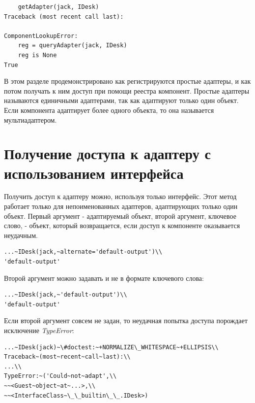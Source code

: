 \documentclass[a4paper,openany,twoside,draft]{book}
\providecommand*{\DUroletitlereference}[1]{\textsl{#1}}
\begin{document}
\begin{verbatim}
    getAdapter(jack, IDesk)
Traceback (most recent call last):

ComponentLookupError:
    reg = queryAdapter(jack, IDesk)
    reg is None
True
\end{verbatim}

В этом разделе продемонстрировано как регистрируются простые адаптеры,
и как потом получать к ним доступ при помощи реестра компонент.
Простые адаптеры называются единичными адаптерами, так как адаптируют
только один объект.  Если компонента адаптирует более одного объекта,
то она называется мультиадаптером.


\section{Получение доступа к адаптеру с использованием интерфейса%
  \label{id37}%
}

Получить доступ к адаптеру можно, используя только интерфейс.  Этот
метод работает только для непоименованных адаптеров, адаптирующих
только один объект.  Первый аргумент - адаптируемый объект, второй
аргумент, ключевое слово, - объект, который возвращается, если доступ
к компоненте оказывается неудачным.

\begin{verbatim}
...~IDesk(jack,~alternate='default-output')\\
'default-output'
\end{verbatim}

Второй аргумент можно задавать и не в формате ключевого слова:

\begin{verbatim}
...~IDesk(jack,~'default-output')\\
'default-output'
\end{verbatim}

Если второй аргумент совсем не задан, то неудачная попытка доступа
порождает исключение \DUroletitlereference{TypeError}:

\begin{verbatim}
...~IDesk(jack)~\#doctest:~+NORMALIZE\_WHITESPACE~+ELLIPSIS\\
Traceback~(most~recent~call~last):\\
...\\
TypeError:~('Could~not~adapt',\\
~~<Guest~object~at~...>,\\
~~<InterfaceClass~\_\_builtin\_\_.IDesk>)
\end{verbatim}
\end{document}
